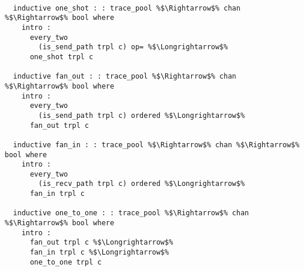 \documentclass{article}
\begin{document}
\begin{lstlisting}[style=codestyle1, escapechar=\%]

  inductive one_shot : : trace_pool %$\Rightarrow$% chan %$\Rightarrow$% bool where
    intro :
      every_two
        (is_send_path trpl c) op= %$\Longrightarrow$% 
      one_shot trpl c

  inductive fan_out : : trace_pool %$\Rightarrow$% chan %$\Rightarrow$% bool where
    intro :
      every_two
        (is_send_path trpl c) ordered %$\Longrightarrow$%
      fan_out trpl c

  inductive fan_in : : trace_pool %$\Rightarrow$% chan %$\Rightarrow$% bool where
    intro :
      every_two
        (is_recv_path trpl c) ordered %$\Longrightarrow$% 
      fan_in trpl c

  inductive one_to_one : : trace_pool %$\Rightarrow$% chan %$\Rightarrow$% bool where
    intro :
      fan_out trpl c %$\Longrightarrow$%
      fan_in trpl c %$\Longrightarrow$% 
      one_to_one trpl c

  \end{lstlisting}
\end{document}
